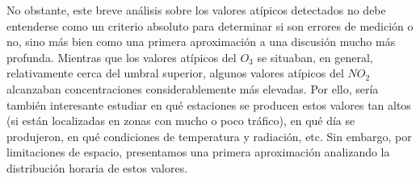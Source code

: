 \documentclass[notspecified,article,submit,oneauthor,pdftex]{Definitions/mdpi}
\begin{document}
No obstante, este breve análisis sobre los valores atípicos detectados
no debe entenderse como un criterio absoluto para determinar si son
errores de medición o no, sino más bien como una primera aproximación a
una discusión mucho más profunda. Mientras que los valores atípicos del
\(O_3\) se situaban, en general, relativamente cerca del umbral
superior, algunos valores atípicos del \(NO_2\) alcanzaban
concentraciones considerablemente más elevadas. Por ello, sería también
interesante estudiar en qué estaciones se producen estos valores tan
altos (si están localizadas en zonas con mucho o poco tráfico), en qué
día se produjeron, en qué condiciones de temperatura y radiación, etc.
Sin embargo, por limitaciones de espacio, presentamos una primera
aproximación analizando la distribución horaria de estos valores.


\vspace{6pt}











\end{document}
